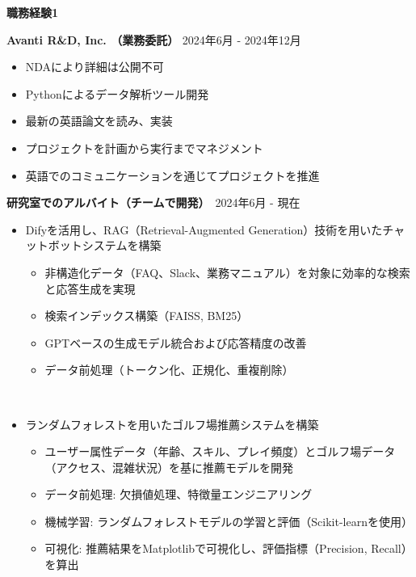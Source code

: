 \documentclass[a4paper,10pt]{article}
\begin{document}
\noindent
\begin{minipage}[t]{0.3\textwidth}
    \textbf{職務経験1}
\end{minipage}%
\begin{minipage}[t]{0.7\textwidth}
     \textbf{Avanti R\&D, Inc. （業務委託）} \hfill 2024年6月 - 2024年12月
    \begin{itemize}
	    \item NDAにより詳細は公開不可
	    \item Pythonによるデータ解析ツール開発  
	    \item 最新の英語論文を読み、実装 
	    \item プロジェクトを計画から実行までマネジメント
	    \item 英語でのコミュニケーションを通じてプロジェクトを推進  \newline
　\end{itemize}

     \textbf{研究室でのアルバイト（チームで開発）}　\hfill 2024年6月 - 現在 
　\begin{itemize}
	    \item Difyを活用し、RAG（Retrieval-Augmented Generation）技術を用いたチャットボットシステムを構築  
	    \begin{itemize}
	    \item 非構造化データ（FAQ、Slack、業務マニュアル）を対象に効率的な検索と応答生成を実現  
	    \item 検索インデックス構築（FAISS, BM25）  
	    \item GPTベースの生成モデル統合および応答精度の改善  
	    \item データ前処理（トークン化、正規化、重複削除）  
	    \end{itemize}
　
	    \item ランダムフォレストを用いたゴルフ場推薦システムを構築  
	    \begin{itemize}
	    \item ユーザー属性データ（年齢、スキル、プレイ頻度）とゴルフ場データ（アクセス、混雑状況）を基に推薦モデルを開発  
	    \item データ前処理: 欠損値処理、特徴量エンジニアリング  
	    \item 機械学習: ランダムフォレストモデルの学習と評価（Scikit-learnを使用）  
	    \item 可視化: 推薦結果をMatplotlibで可視化し、評価指標（Precision, Recall）を算出  
	    \end{itemize}
\end{itemize}
\end{minipage}
\end{document}
